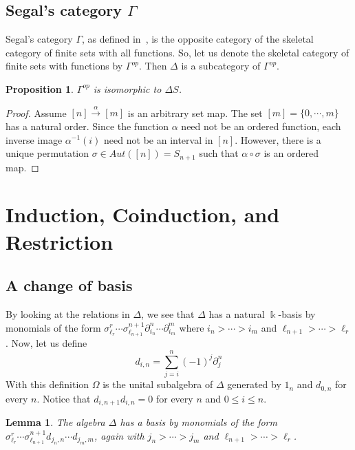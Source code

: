 \documentclass[a4paper,11pt]{amsart}
\newtheorem{proposition}[theorem]{Proposition}
\newtheorem{lemma}[theorem]{Lemma}
\theoremstyle{definition}
\newcommand{\Simp}{{\Delta}}
\newcommand{\Diff}{{\Omega}}
\begin{document}
\subsection{Segal's category $\Gamma$}


Segal's category $\Gamma$, as defined in~\cite{Segal:CategoriesCohomologyTheories}, is the opposite category of the skeletal category of finite sets with all functions. So, let us denote the skeletal category of finite sets with functions by $\Gamma^{op}$. Then $\Simp$ is a subcategory of $\Gamma^{op}$.

\begin{proposition}
 $\Gamma^{op}$ is isomorphic to $\Simp S$.    
\end{proposition}

\begin{proof}
    Assume $[n]\xrightarrow{\alpha}[m]$ is an arbitrary set map. The set $[m] = \{0,\cdots,m\}$ has a natural order. Since the function $\alpha$ need not be an ordered function, each inverse image $\alpha^{-1}(i)$ need not be an interval in $[n]$. However, there is a unique permutation $\sigma\in Aut([n]) = S_{n+1}$ such that $\alpha\circ\sigma$ is an ordered map. 
\end{proof}

\section{Induction, Coinduction, and Restriction}

\subsection{A change of basis}

By looking at the relations in $\Simp$, we see that $\Simp$ has a natural $\Bbbk$-basis by monomials of the form $\sigma^r_{\ell_r}\cdots \sigma^{n+1}_{\ell_{n+1}}\partial^n_{i_n}\cdots \partial^m_{i_m}$ where $i_n>\cdots > i_m$ and $\ell_{n+1} >\cdots > \ell_r$. Now, let us define
\begin{equation}
    d_{i,n} = \sum_{j=i}^n (-1)^j \partial^n_j
\end{equation}
With this definition $\Diff$ is the unital subalgebra of $\Simp$ generated by $1_n$ and $d_{0,n}$ for every $n$.  Notice that $d_{i,n+1}d_{i,n} = 0$ for every $n$ and $0\leq i\leq n$. 

\begin{lemma}
  The algebra $\Simp$ has a basis by monomials of the form $\sigma^r_{\ell_r}\cdots \sigma^{n+1}_{\ell_{n+1}}d_{j_n,n}\cdots d_{j_m,m}$, again with $j_n>\cdots > j_m$ and  $\ell_{n+1} >\cdots > \ell_r$.
\end{lemma}
\end{document}
